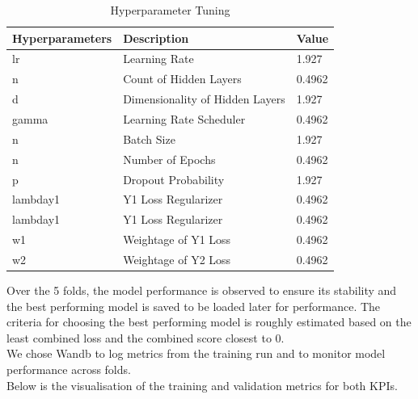 \documentclass{report} %
\begin{document}
\begin{table}[H]
    \centering
    \begin{tabularx}{1\linewidth}{|X|X|X|}
    \hline {\bf Hyperparameters} & {\bf Description} & {\bf Value}\\
    \hline 
    lr & Learning Rate & 1.927 \\
    n & Count of Hidden Layers & 0.4962 \\
    d & Dimensionality of Hidden Layers& 1.927 \\
    gamma & Learning Rate Scheduler & 0.4962 \\
    n & Batch Size & 1.927 \\
    n & Number of Epochs & 0.4962 \\
    p & Dropout Probability& 1.927 \\
    lambday1 & Y1 Loss Regularizer & 0.4962 \\
    lambday1 & Y1 Loss Regularizer & 0.4962 \\
    w1 & Weightage of Y1 Loss & 0.4962 \\
    w2 & Weightage of Y2 Loss & 0.4962 \\
    \hline
    \end{tabularx}
    \caption{Hyperparameter Tuning}
\end{table}

Over the 5 folds, the model performance is observed to ensure its stability and the best performing model is saved to be loaded later for performance.
The criteria for choosing the best performing model is roughly estimated based on the least combined loss and the combined score closest to 0.\\
We chose \ac{Wandb} to log metrics from the training run and to monitor model performance across folds. \\
Below is the visualisation of the training and validation metrics for both \ac{KPI}s.\\
\end{document}
